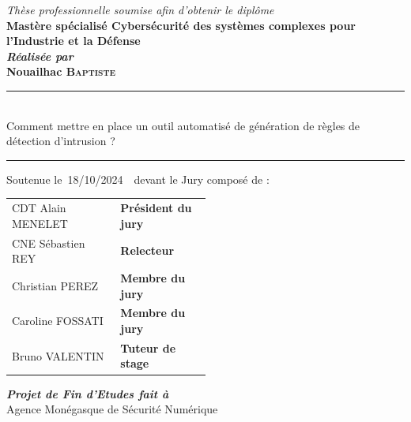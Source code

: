 \documentclass[a4paper, oneside, 12pt, final]{extreport}
\newcommand{\reportAuthor} {%
  Nouailhac \textsc{Baptiste}%
}
\newcommand{\reportSubject} {%
  \LARGE{Comment mettre en place un outil automatisé de génération de règles de détection d'intrusion ?}%
}
\newcommand{\dateSoutenance} {%
 18/10/2024%
}
\newcommand{\studyDepartment} {%
  Agence Monégasque de Sécurité Numérique %
}
\newcommand{\juryPresident} {%
  CDT Alain \textsc{MENELET}%
}
\newcommand{\juryPresidentDesc} {%
  \textbf{Président du jury}%
}
\newcommand{\juryMemberOne} {%
  CNE Sébastien \textsc{REY}%
}
\newcommand{\juryMemberOneDesc} {%
  \textbf{Relecteur} %
}
\newcommand{\juryMemberTwo} {%
  Christian \textsc{PEREZ}%
}
\newcommand{\juryMemberTwoDesc} {%
  \textbf{Membre du jury}  %
}
\newcommand{\juryMemberThree} {%
  Caroline \textsc{FOSSATI}%
}
\newcommand{\juryMemberThreeDesc} {%
  \textbf{Membre du jury}  %
}
\newcommand{\juryMemberFour} {%
  Bruno \textsc{VALENTIN}%
}
\newcommand{\juryMemberFourDesc} {%
  \textbf{Tuteur de stage} %
}
\begin{document}
\begin{titlepage}
\begin{center}
\vspace{10pt} {%
  \renewcommand*{\familydefault}{\defaultFont}
  \fontsize{46pt}{46pt}\selectfont%
}

\vspace{5pt}

\vspace{15pt}
{\textit{Thèse professionnelle soumise afin d'obtenir le diplôme}}\\

\vspace{10pt}
{\textbf{\large Mastère spécialisé Cybersécurité des systèmes complexes pour l'Industrie et la Défense}}\\

\vspace{5pt}
\textbf{\textit{Réalisée par}}\\
\vspace{10pt} {%
  \fontsize{14pt}{14pt}\selectfont%
  {\bfseries\Large\sc \reportAuthor}\\
}%

\vspace{5pt} {%
  \renewcommand*{\familydefault}{\defaultFont}
  \fontsize{27pt}{27pt}\selectfont%
  \rule{0.5\textwidth}{.4pt}\\
  \vspace{10pt}
  \reportSubject{}\\%
  \vspace{10pt}
  \rule{0.5\textwidth}{.4pt}
}

\vspace{30pt}
Soutenue le\, \dateSoutenance\,\, devant le Jury compos\'e de :\\
\vspace{10pt}
\begin{tabular}{p{0.3\linewidth} p{0.2\linewidth}}
  \juryPresident{} & \juryPresidentDesc{}\\
  \juryMemberOne{} & \juryMemberOneDesc{}\\
  \juryMemberTwo{} & \juryMemberTwoDesc{}\\
  \juryMemberThree{} & \juryMemberThreeDesc{}\\
  \juryMemberFour{} & \juryMemberFourDesc{}\\
\end{tabular}


\vspace{15pt}%
\textbf{\textit{Projet de Fin d'Etudes fait \`a}}\\
\vspace{5pt}
\studyDepartment
\vspace{5pt}


\end{center}
\end{titlepage}
\end{document}
